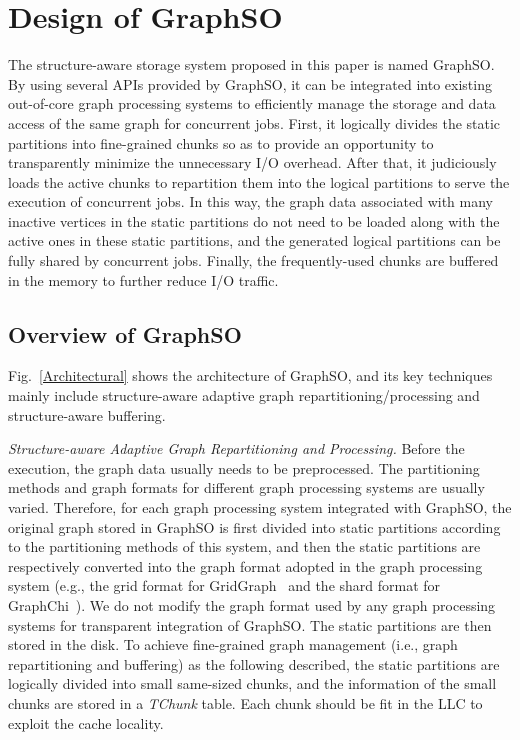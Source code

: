 \documentclass[10pt,journal,compsoc]{IEEEtran}
\begin{document}
\vspace{-10pt}
\section{Design of GraphSO}\label{sec:3}
\vspace{-2pt}
The structure-aware storage system proposed in this paper is named GraphSO. By using several APIs provided by GraphSO, it can be integrated into existing out-of-core graph processing systems to efficiently manage the storage and data access of the same graph for concurrent jobs. First, it logically divides the static partitions into fine-grained chunks so as to provide an opportunity to transparently minimize the unnecessary I/O overhead.
After that, it judiciously loads the active chunks to repartition them into the logical partitions to serve the execution of concurrent jobs.
In this way, the graph data associated with many inactive vertices in the static partitions do not need to be loaded along with the active ones in these static partitions, and the generated logical partitions can be fully shared by concurrent jobs.
Finally, the frequently-used chunks are buffered in the memory to further reduce I/O traffic. %

\vspace{-10pt}
\subsection{Overview of GraphSO}
\vspace{-2pt}
Fig.~\ref{Architectural} shows the architecture of GraphSO, and its key techniques mainly include structure-aware adaptive graph repartitioning/processing and structure-aware buffering. %


\textit{Structure-aware Adaptive Graph Repartitioning and Processing.} Before the execution, the graph data usually needs to be preprocessed.
The partitioning methods and graph formats for different graph processing systems are usually varied. Therefore, for each graph processing system integrated with GraphSO, the original graph stored in GraphSO is first divided into static partitions according to the partitioning methods of this system, and then the static partitions are respectively converted into the graph format adopted in the graph processing system (e.g., the grid format for GridGraph~\cite{GridGraph} and the shard format for GraphChi~\cite{GraphChi}).
We do not modify the graph format used by any graph processing systems for transparent integration of GraphSO.
The static partitions are then stored in the disk.
To achieve fine-grained graph management (i.e., graph repartitioning and buffering) as the following described, the static partitions are logically divided into small same-sized chunks, and the information of the small chunks are stored in a \textit{TChunk} table. Each chunk should be fit in the LLC to exploit the cache locality.
\end{document}
